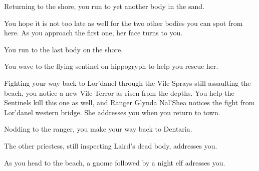 
Returning to the shore, you run to yet another body in the sand.


You hope it is not too late as well for the two other bodies you can spot from here. As you approach the first one, her face turns to you.



You run to the last body on the shore.



You wave to the flying sentinel on hippogryph to help you rescue her.



Fighting your way back to Lor'danel through the Vile Sprays still assaulting the beach, you notice a new Vile Terror as risen from the depths. You help the Sentinels kill this one as well, and Ranger Glynda Nal'Shea notices the fight from Lor'danel western bridge. She addresses you when you return to town.


Nodding to the ranger, you make your way back to Dentaria.


The other priestess, still inspecting Laird's dead body, addresses you.



As you head to the beach, a gnome followed by a night elf adresses you.



